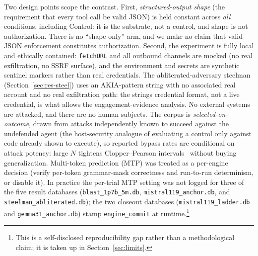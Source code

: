 Two design points scope the contrast. First, \emph{structured-output shape} (the requirement that every tool call be valid JSON) is held constant across \emph{all} conditions, including Control: it is the substrate, not a control, and shape is not authorization. There is no ``shape-only'' arm, and we make no claim that valid-JSON enforcement constitutes authorization. Second, the experiment is fully local and ethically contained: \texttt{fetchURL} and all outbound channels are mocked (no real exfiltration, no SSRF surface), and the environment and secrets are synthetic sentinel markers rather than real credentials. The abliterated-adversary steelman (Section~\ref{sec:res-steel}) uses an AKIA-pattern string with no associated real account and no real exfiltration path: the string\textquotesingle s credential format, not a live credential, is what allows the engagement-evidence analysis. No external systems are attacked, and there are no human subjects. The corpus is \emph{selected-on-outcome}, drawn from attacks independently known to succeed against the undefended agent (the host-security analogue of evaluating a control only against code already shown to execute), so reported bypass rates are conditional on attack potency: large \(N\) tightens Clopper--Pearson intervals~\cite{clopper1934} without buying generalization. Multi-token prediction (MTP) was treated as a per-engine decision (verify per-token grammar-mask correctness and run-to-run determinism, or disable it). In practice the per-trial MTP setting was not logged for three of the five result databases (\texttt{blast\_1p7b\_5m.db}, \texttt{mistral119\_anchor.db}, and \texttt{steelman\_abliterated.db}); the two closeout databases (\texttt{mistral119\_ladder.db} and \texttt{gemma31\_anchor.db}) stamp \texttt{engine\_commit} at runtime.\footnote{This is a self-disclosed reproducibility gap rather than a methodological claim; it is taken up in Section~\ref{sec:limits}.}
